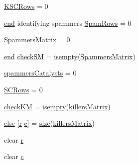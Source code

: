 \begin{DoxyCompactItemize}
\item 
\hyperlink{a00029_a56aa0b3ac00410dc36f9043c641ae205}{K\+S\+C\+Rows} = 0
\item 
\hyperlink{a00025_afb358f48b1646c750fb9da6c6585be2b}{end} identifying spammers \hyperlink{a00029_a834631ce660b52d721b1dd57b60d5251}{Spam\+Rows} = 0
\item 
\hyperlink{a00029_af1801174c9397e7fad0394203f120c31}{Spammers\+Matrix} = 0
\item 
\hyperlink{a00025_afb358f48b1646c750fb9da6c6585be2b}{end} \hyperlink{a00029_ae80cf4c5bf659247b45bbad5d22dec52}{check\+S\+M} = \hyperlink{a00025_ac10445404f4b83302522defb59e25ef7}{isempty}(\hyperlink{a00030_a5bca8ffaecd726e70d088f2e00c9b4e0}{Spammers\+Matrix})
\item 
\hyperlink{a00029_aac2cfcb79655911b15197407f3e8c51c}{spammers\+Catalysts} = 0
\item 
\hyperlink{a00029_a4c9731061d3ea74c9ad35793b15491ab}{S\+C\+Rows} = 0
\item 
\hyperlink{a00029_ac9c871eaf7455dc0d274ec20c5c69ac2}{check\+K\+M} = \hyperlink{a00025_ac10445404f4b83302522defb59e25ef7}{isempty}(\hyperlink{a00030_ab372fd9c8bb38cf3c78e995c0698b0ca}{killers\+Matrix})
\item 
\hyperlink{a00029_af5946383720aa572eb93e1e63afc23c2}{else} \mbox{[}\hyperlink{a00031_ac862e7284527eb913b1351c8bfb8e079}{r} \hyperlink{a00035_a6be92348ba85ef257b11d06209e1d7b6}{c}\mbox{]} = \hyperlink{a00104_ae113ea7f9e515a12ac4b5595c6faf61e}{size}(\hyperlink{a00030_ab372fd9c8bb38cf3c78e995c0698b0ca}{killers\+Matrix})
\item 
clear \hyperlink{a00029_ac862e7284527eb913b1351c8bfb8e079}{r}
\item 
clear \hyperlink{a00029_a8e54ca14679a1ce9245a3b7d55d95570}{c}
\end{DoxyCompactItemize}


